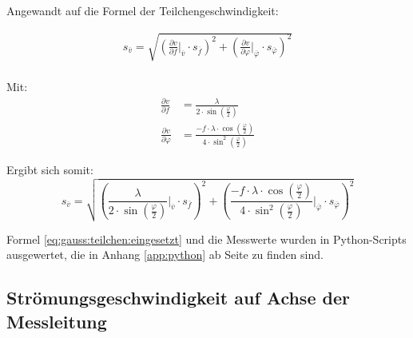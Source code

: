 Angewandt auf die Formel der Teilchengeschwindigkeit:

\begin{equation}
    \label{eq:gauss:teilchen}
    \begin{split}
        s_{\overline{v}} = \sqrt{ \left( \frac{\partial v}{\partial f}       \biggr\rvert_{\overline{v}}       \cdot s_{\overline{f}}       \right)^2
                                + \left( \frac{\partial v}{\partial \varphi} \biggr\rvert_{\overline{\varphi}} \cdot s_{\overline{\varphi}} \right)^2
                                } \\
    \end{split}
\end{equation}

Mit:
\begin{align}
    \label{eq:partials}
    \frac{\partial v}{\partial f}       &= \frac{\lambda}{2 \cdot \sin \left( \frac{\varphi}{2} \right) } \\
    \frac{\partial v}{\partial \varphi} &= \frac{-f \cdot \lambda \cdot \cos\left(\frac{\varphi}{2}\right)}{4 \cdot \sin^2\left(\frac{\varphi}{2}\right)}
\end{align}

Ergibt sich somit:
\begin{equation}
    \label{eq:gauss:teilchen:eingesetzt}
    s_{\overline{v}} = \sqrt{ \left( \frac{\lambda}                                                    {2 \cdot \sin  \left( \frac{\varphi}{2} \right)} \biggr\rvert_{\overline{v}}       \cdot s_{\overline{f}}       \right)^2
                            + \left( \frac{-f \cdot \lambda \cdot \cos\left( \frac{\varphi}{2} \right)}{4 \cdot \sin^2\left( \frac{\varphi}{2} \right)} \biggr\rvert_{\overline{\varphi}} \cdot s_{\overline{\varphi}} \right)^2
                            }
\end{equation}

Formel   \ref{eq:gauss:teilchen:eingesetzt}  und   die  Messwerte   wurden  in
Python-Scripts   ausgewertet,  die   in  Anhang   \ref{app:python}  ab   Seite
\pageref{app:python} zu finden sind.



\clearpage
\subsection{Str\"omungsgeschwindigkeit auf Achse der Messleitung}
\label{subsec:achse}


